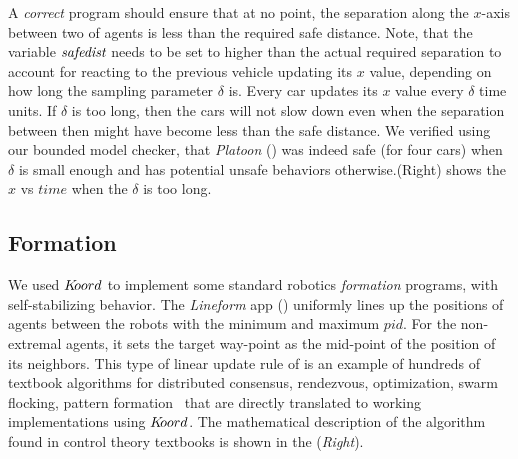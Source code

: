  A \emph{correct} program should ensure that at no point, the separation along the $x$-axis between two of agents is less than the required safe distance.  Note, that the variable $\emph{safedist}$ needs to be set to higher than the actual required separation to account for reacting to the previous vehicle updating its $\mathit{x}$ value, depending on how long the sampling parameter $\delta$ is. Every car updates its $x$ value every $\delta$ time units. If $\delta$ is too long, then the cars will not slow down even when the separation between then might have become less than the safe distance. We verified using our bounded model checker, that \emph{Platoon} () was indeed safe (for four cars) when $\delta$ is small enough and has potential unsafe behaviors otherwise.(Right) shows the $x$ vs $\mathit{time}$ when the $\delta$ is too long.

\subsection{Formation}
\label{sec:formation}
We used $K\kern-2pt oord$ to implement some standard robotics \emph{formation} programs, with self-stabilizing behavior. The \emph{Lineform} app () uniformly lines up the positions of  agents between the robots with the minimum and maximum $pid$. For the non-extremal agents, it sets the target way-point as the mid-point of the position of its neighbors. This type of linear update rule of is an example of hundreds of textbook algorithms for distributed consensus, rendezvous, optimization, swarm flocking, pattern formation~\cite{Tsitsiklis:1986,Blondel,Magnusbook2010} that are directly translated to working implementations using $K\kern-2pt oord$. The mathematical description of the algorithm found in control theory textbooks is shown in the  (\emph{Right}). 

